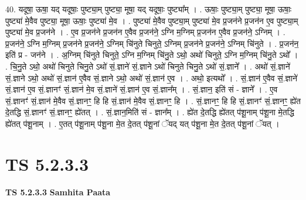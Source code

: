 \documentclass[17pt]{extarticle}
\begin{document}
40. यदूषा॒ ऊषा॒ यद् यदूषाः॒ पुष्ट्या॒म् पुष्ट्या॒ मूषा॒ यद् यदूषाः॒ पुष्ट्या᳚म् । . ऊषाः॒ पुष्ट्या॒म् पुष्ट्या॒ मूषा॒ ऊषाः॒ पुष्ट्या॑ मे॒वैव पुष्ट्या॒ मूषा॒ ऊषाः॒ पुष्ट्या॑ मे॒व । . पुष्ट्या॑ मे॒वैव पुष्ट्या॒म् पुष्ट्या॑ मे॒व प्र॒जन॑ने प्र॒जन॑न ए॒व पुष्ट्या॒म् पुष्ट्या॑ मे॒व प्र॒जन॑ने । . ए॒व प्र॒जन॑ने प्र॒जन॑न ए॒वैव प्र॒जन॑ने॒ ऽग्नि म॒ग्निम् प्र॒जन॑न ए॒वैव प्र॒जन॑ने॒ ऽग्निम् । . प्र॒जन॑ने॒ ऽग्नि म॒ग्निम् प्र॒जन॑ने प्र॒जन॑ने॒ ऽग्निम् चि॑नुते चिनुते॒ ऽग्निम् प्र॒जन॑ने प्र॒जन॑ने॒ ऽग्निम् चि॑नुते । . प्र॒जन॑न॒ इति॑ प्र - जन॑ने । . अ॒ग्निम् चि॑नुते चिनुते॒ ऽग्नि म॒ग्निम् चि॑नु॒ते ऽथो॒ अथो॑ चिनुते॒ ऽग्नि म॒ग्निम् चि॑नु॒ते ऽथो᳚ । . चि॒नु॒ते ऽथो॒ अथो॑ चिनुते चिनु॒ते ऽथो॑ सं॒.ज्ञाने॑ सं॒.ज्ञाने ऽथो॑ चिनुते चिनु॒ते ऽथो॑ सं॒.ज्ञाने᳚ । . अथो॑ सं॒.ज्ञाने॑ सं॒.ज्ञाने ऽथो॒ अथो॑ सं॒.ज्ञान॑ ए॒वैव सं॒.ज्ञाने ऽथो॒ अथो॑ सं॒.ज्ञान॑ ए॒व । . अथो॒ इत्यथो᳚ । . सं॒.ज्ञान॑ ए॒वैव सं॒.ज्ञाने॑ सं॒.ज्ञान॑ ए॒व सं॒.ज्ञानꣳ॑ सं॒.ज्ञान॑ मे॒व सं॒.ज्ञाने॑ सं॒.ज्ञान॑ ए॒व सं॒.ज्ञान᳚म् । . सं॒.ज्ञान॒ इति॑ सं - ज्ञाने᳚ । . ए॒व सं॒.ज्ञानꣳ॑ सं॒.ज्ञान॑ मे॒वैव सं॒.ज्ञानꣳ॒॒ हि हि सं॒.ज्ञान॑ मे॒वैव सं॒.ज्ञानꣳ॒॒ हि । . सं॒.ज्ञानꣳ॒॒ हि हि सं॒.ज्ञानꣳ॑ सं॒.ज्ञानꣳ॒॒ ह्ये॑त दे॒तद्धि सं॒.ज्ञानꣳ॑ सं॒.ज्ञानꣳ॒॒ ह्ये॑तत् । . सं॒.ज्ञान॒मिति॑ सं - ज्ञान᳚म् । . ह्ये॑त दे॒तद्धि ह्ये॑तत् प॑शू॒नाम् प॑शू॒ना मे॒तद्धि ह्ये॑तत् प॑शू॒नाम् । . ए॒तत् प॑शू॒नाम् प॑शू॒ना मे॒त दे॒तत् प॑शू॒नां ॅयद् यत् प॑शू॒ना मे॒त दे॒तत् प॑शू॒नां ॅयत् । \newline
\pagebreak
{}

\section{ TS 5.2.3.3 }

\textbf{TS 5.2.3.3 } \newline
\textbf{Samhita Paata} \newline
\end{document}
